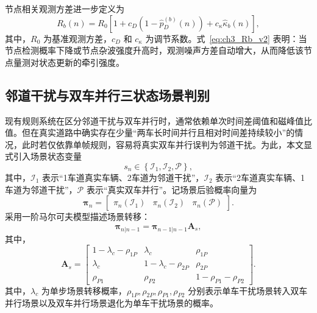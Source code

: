 \documentclass{xdupgthesis}
\begin{document}
节点相关观测方差进一步定义为
\begin{equation}
	R_b(n)=R_0\left[1+c_D\left(1-\hat p_D^{(b)}(n)\right)+c_{\kappa}\hat \kappa_b(n)\right],
	\label{eq:ch3_Rb_v2}
\end{equation}
其中，$R_0$ 为基准观测方差，$c_D$ 和 $c_{\kappa}$ 为调节系数。式~\eqref{eq:ch3_Rb_v2} 表明：当节点检测概率下降或节点杂波强度升高时，观测噪声方差自动增大，从而降低该节点量测对状态更新的牵引强度。

\subsection{邻道干扰与双车并行三状态场景判别}
\label{subsec:ch3_scene_hmm_v2}

现有规则系统在区分邻道干扰与双车并行时，通常依赖单次时间差阈值和磁峰值比值。但在真实道路中确实存在少量“两车长时间并行且相对时间差持续较小”的情况，此时若仅依靠单帧规则，容易将真实双车并行误判为邻道干扰。为此，本文显式引入场景状态变量
\begin{equation}
	s_n\in\left\{\mathcal I_1,\mathcal I_2,\mathcal P\right\},
	\label{eq:ch3_scene_state_v2}
\end{equation}
其中，$\mathcal I_1$ 表示“1车道真实车辆、2车道为邻道干扰”，$\mathcal I_2$ 表示“2车道真实车辆、1车道为邻道干扰”，$\mathcal P$ 表示“真实双车并行”。记场景后验概率向量为
\begin{equation}
	\boldsymbol\pi_n=
	\begin{bmatrix}
		\pi_n(\mathcal I_1) &
		\pi_n(\mathcal I_2) &
		\pi_n(\mathcal P)
	\end{bmatrix}.
	\label{eq:ch3_scene_vector_v2}
\end{equation}
采用一阶马尔可夫模型描述场景转移：
\begin{equation}
	\boldsymbol\pi_{n|n-1}=\boldsymbol\pi_{n-1|n-1}\mathbf A_s,
	\label{eq:ch3_scene_predict_v2}
\end{equation}
其中，
\begin{equation}
	\mathbf A_s=
	\begin{bmatrix}
		1-\lambda_c-\rho_{1P} & \lambda_c & \rho_{1P}\\
		\lambda_c & 1-\lambda_c-\rho_{2P} & \rho_{2P}\\
		\rho_{P1} & \rho_{P2} & 1-\rho_{P1}-\rho_{P2}
	\end{bmatrix}.
	\label{eq:ch3_As_v2}
\end{equation}
其中，$\lambda_c$ 为单步场景转移概率，$\rho_{1P},\rho_{2P},\rho_{P1},\rho_{P2}$ 分别表示单车干扰场景转入双车并行场景以及双车并行场景退化为单车干扰场景的概率。
\end{document}
